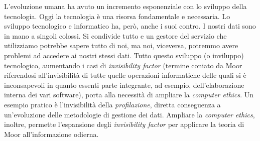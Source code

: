 L’evoluzione umana ha avuto un incremento esponenziale con lo sviluppo della tecnologia. Oggi la tecnologia è una risorsa fondamentale e necessaria. Lo sviluppo tecnologico e informatico ha, però, anche i suoi contro. I nostri dati sono in mano a singoli colossi. Si condivide tutto e un gestore del servizio che utilizziamo potrebbe sapere tutto di noi, ma noi, viceversa, potremmo avere problemi ad accedere ai nostri stessi dati. Tutto questo sviluppo (o inviluppo) tecnologico, aumentando i casi di \textit{invisibility factor} (termine coniato da Moor riferendosi all’invisibilità di tutte quelle operazioni informatiche delle quali si è inconsapevoli in quanto essenti parte integrante, ad esempio, dell’elaborazione interna dei vari software), porta alla necessità di ampliare la \textit{computer ethics}. Un esempio pratico è l’invisibilità della \textit{profilazione}, diretta conseguenza a un’evoluzione delle metodologie di gestione dei dati. Ampliare la \textit{computer ethics}, inoltre, permette l’espansione degli \textit{invisibility factor} per applicare la teoria di Moor all’informazione odierna.